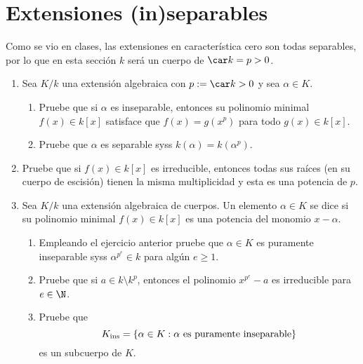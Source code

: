 \documentclass[11pt, reqno]{amsart}
\begin{document}
\section{Extensiones (in)separables}
Como se vio en clases, las extensiones en característica cero son todas separables, por lo que en esta sección $k$ será
un cuerpo de $\car k = p > 0$.
\begin{enumerate}[resume]
	\item Sea $K/k$ una extensión algebraica con $p := \car k > 0$ y sea $\alpha \in K$.
		\begin{enumerate}
			\item Pruebe que si $\alpha$ es inseparable, entonces su polinomio minimal $f(x) \in k[x]$
				satisface que $f(x) = g(x^p)$ para todo $g(x) \in k[x]$.
			\item Pruebe que $\alpha$ es separable syss $k(\alpha) = k(\alpha^p)$.
		\end{enumerate}

	\item Pruebe que si $f(x) \in k[x]$ es irreducible, entonces todas sus raíces (en su cuerpo de escisión) tienen
		la misma multiplicidad y esta es una potencia de $p$.

	\item Sea $K/k$ una extensión algebraica de cuerpos.
		Un elemento $\alpha \in K$ se dice  si su polinomio minimal $f(x) \in k[x]$
		es una potencia del monomio $x - \alpha$.
		\begin{enumerate}
			\item\lookright
				Empleando el ejercicio anterior pruebe que $\alpha \in K$ es puramente inseparable syss
				$\alpha^{p^e} \in k$ para algún $e \ge 1$.
			\item Pruebe que si $a \in k \setminus k^p$, entonces el polinomio $x^{p^e} - a$ es irreducible
				para $e \in \N$.
			\item Pruebe que
				\[
					K_{\rm ins} = \{ \alpha \in K : \alpha \text{ es puramente inseparable} \}
				\]
				es un subcuerpo de $K$.
		\end{enumerate}
\end{enumerate}

\nocite{lang:algebra}

\printbibliography
\end{document}
